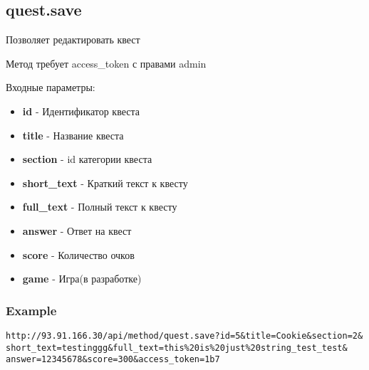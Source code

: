 \subsection{quest.save}
Позволяет редактировать квест

Метод требует access\_token с правами admin

Входные параметры:
\begin{itemize}
  \item \textbf{id} - Идентификатор квеста
  \item \textbf{title} - Название квеста
  \item \textbf{section} - id категории квеста
  \item \textbf{short\_text} - Краткий текст к квесту
  \item \textbf{full\_text} - Полный текст к квесту
  \item \textbf{answer} - Ответ на квест
  \item \textbf{score} - Количество очков
  \item \textbf{game} - Игра(в разработке)
\end{itemize}

\subsubsection{Example}
\begin{Verbatim}[frame=single]
http://93.91.166.30/api/method/quest.save?id=5&title=Cookie&section=2&
short_text=testinggg&full_text=this%20is%20just%20string_test_test&
answer=12345678&score=300&access_token=1b7
\end{Verbatim}